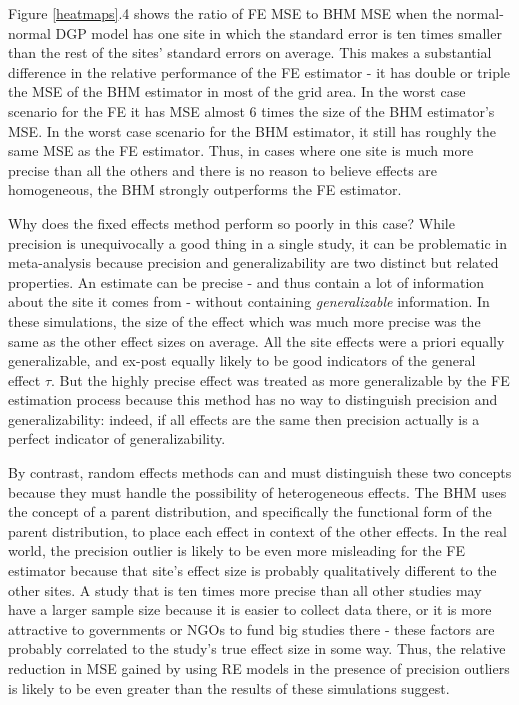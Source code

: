 \documentclass[12pt]{article}
\begin{document}
Figure \ref{heatmaps}.4 shows the ratio of FE MSE to BHM MSE when the normal-normal DGP model has one site in which the standard error is ten times smaller than the rest of the sites' standard errors on average. This makes a substantial difference in the relative performance of the FE estimator - it has double or triple the MSE of the BHM estimator in most of the grid area. In the worst case scenario for the FE it has MSE almost 6 times the size of the BHM estimator's MSE. In the worst case scenario for the BHM estimator, it still has roughly the same MSE as the FE estimator. Thus, in cases where one site is much more precise than all the others and there is no reason to believe effects are homogeneous, the BHM strongly outperforms the FE estimator.

Why does the fixed effects method perform so poorly in this case? While precision is unequivocally a good thing in a single study, it can be problematic in meta-analysis because precision and generalizability are two distinct but related properties. An estimate can be precise - and thus contain a lot of information about the site it comes from - without containing \emph{generalizable} information. In these simulations, the size of the effect which was much more precise was the same as the other effect sizes on average. All the site effects were a priori equally generalizable, and ex-post equally likely to be good indicators of the general effect $\tau$. But the highly precise effect was treated as more generalizable by the FE estimation process because this method has no way to distinguish precision and generalizability: indeed, if all effects are the same then precision actually is a perfect indicator of generalizability. 

By contrast, random effects methods can and must distinguish these two concepts because they must handle the possibility of heterogeneous effects. The BHM uses the concept of a parent distribution, and specifically the functional form of the parent distribution, to place each effect in context of the other effects. In the real world, the precision outlier is likely to be even more misleading for the FE estimator because that site's effect size is probably qualitatively different to the other sites. A study that is ten times more precise than all other studies may have a larger sample size because it is easier to collect data there, or it is more attractive to governments or NGOs to fund big studies there - these factors are probably correlated to the study's true effect size in some way. Thus, the relative reduction in MSE gained by using RE models in the presence of precision outliers is likely to be even greater than the results of these simulations suggest. 
\end{document}
